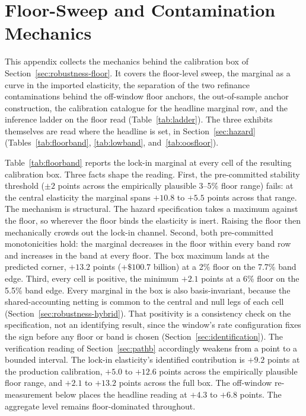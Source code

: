 \documentclass[12pt]{article}
\begin{document}
\nocite{cfpb_atr,frbny_soma,fred_actliscou,fred_wshomcb,fred_dspic96,fred_umcsent}

\section{Floor-Sweep and Contamination Mechanics}\label{app:floormech}

This appendix collects the mechanics behind the calibration box of Section~\ref{sec:robustness-floor}. It covers the floor-level sweep, the marginal as a curve in the imported elasticity, the separation of the two refinance contaminations behind the off-window floor anchors, the out-of-sample anchor construction, the calibration catalogue for the headline marginal row, and the inference ladder on the floor read (Table~\ref{tab:ladder}). The three exhibits themselves are read where the headline is set, in Section~\ref{sec:hazard} (Tables~\ref{tab:floorband}, \ref{tab:lowband}, and~\ref{tab:oosfloor}).

Table~\ref{tab:floorband} reports the lock-in marginal at every cell of the resulting calibration box. Three facts shape the reading. First, the pre-committed stability threshold ($\pm 2$ points across the empirically plausible 3--5\% floor range) fails: at the central elasticity the marginal spans $+10.8$ to $+5.5$ points across that range. The mechanism is structural. The hazard specification takes a maximum against the floor, so wherever the floor binds the elasticity is inert. Raising the floor then mechanically crowds out the lock-in channel. Second, both pre-committed monotonicities hold: the marginal decreases in the floor within every band row and increases in the band at every floor. The box maximum lands at the predicted corner, $+13.2$ points ($+\$100.7$ billion) at a 2\% floor on the 7.7\% band edge. Third, every cell is positive, the minimum $+2.1$ points at a 6\% floor on the 5.5\% band edge. Every marginal in the box is also basis-invariant, because the shared-accounting netting is common to the central and null legs of each cell (Section~\ref{sec:robustness-hybrid}). That positivity is a consistency check on the specification, not an identifying result, since the window's rate configuration fixes the sign before any floor or band is chosen (Section~\ref{sec:identification}). The verification reading of Section~\ref{sec:pathb} accordingly weakens from a point to a bounded interval. The lock-in elasticity's identified contribution is $+9.2$ points at the production calibration, $+5.0$ to $+12.6$ points across the empirically plausible floor range, and $+2.1$ to $+13.2$ points across the full box. The off-window re-measurement below places the headline reading at $+4.3$ to $+6.8$ points. The aggregate level remains floor-dominated throughout.
\end{document}

